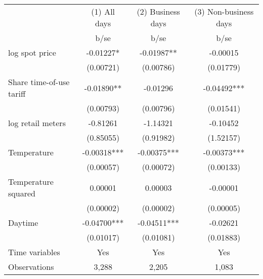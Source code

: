 \begin{tabular}{lccc}\toprule
                    &(1) All days   &(2) Business days   &(3) Non-business days   \\
                    &        b/se   &        b/se   &        b/se   \\
\midrule
log spot price      &    -0.01227*  &    -0.01987** &    -0.00015   \\
                    &   (0.00721)   &   (0.00786)   &   (0.01779)   \\
Share time-of-use tariff&    -0.01890** &    -0.01296   &    -0.04492***\\
                    &   (0.00793)   &   (0.00796)   &   (0.01541)   \\
log retail meters   &    -0.81261   &    -1.14321   &    -0.10452   \\
                    &   (0.85055)   &   (0.91982)   &   (1.52157)   \\
Temperature         &    -0.00318***&    -0.00375***&    -0.00373***\\
                    &   (0.00057)   &   (0.00072)   &   (0.00133)   \\
Temperature squared &     0.00001   &     0.00003   &    -0.00001   \\
                    &   (0.00002)   &   (0.00002)   &   (0.00005)   \\
Daytime             &    -0.04700***&    -0.04511***&    -0.02621   \\
                    &   (0.01017)   &   (0.01081)   &   (0.01883)   \\
Time variables      &         Yes   &         Yes   &         Yes   \\
\midrule
Observations        &       3,288   &       2,205   &       1,083   \\
\bottomrule\end{tabular}
